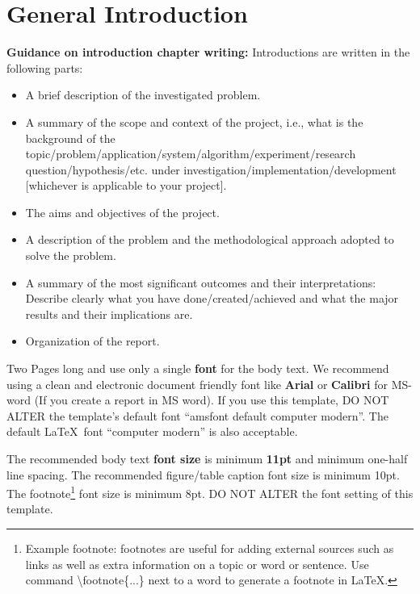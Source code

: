 \chapter*{General Introduction}
\label{ch:intoGen} %

\textbf{Guidance on introduction chapter writing:} Introductions are written in the following parts:
\begin{itemize}
    \item A brief  description of the investigated problem.
    \item A summary of the scope and context of the project, i.e., what is the background of the topic/problem/application/system/algorithm/experiment/research question/hypothesis/etc. under investigation/implementation/development [whichever is applicable to your project].
    \item The aims and objectives of the project.
    \item A description of the problem and the methodological approach adopted to solve the problem.
    \item A summary of the most significant outcomes and their interpretations: Describe clearly what you have done/created/achieved and what the major results and their implications are. 
    \item Organization of the report. 
\end{itemize}


 
Two Pages long and use only a single \textbf{font} for the body text. We recommend using a clean and electronic document friendly font like \textbf{Arial} or \textbf{Calibri} for MS-word (If you create a report in MS word). If you use this template, DO NOT ALTER the template's default font ``amsfont default computer modern''. The default \LaTeX~font ``computer modern'' is also acceptable. 

The recommended body text \textbf{font size} is minimum \textbf{11pt} and minimum one-half line spacing. The recommended figure/table caption font size is minimum 10pt. The footnote\footnote{Example footnote: footnotes are useful for adding external sources such as links as well as extra information on a topic or word or sentence. Use command \textbackslash footnote\{...\} next to a word to generate a footnote in \LaTeX.} font size is minimum 8pt. DO NOT ALTER the font setting of this template.

